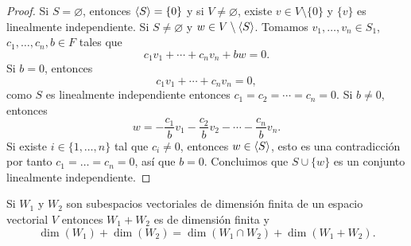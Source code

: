 \documentclass[12pt,a4paper]{book}
\begin{document}
    \begin{proof}
        Si $S=\varnothing$, entonces $\langle S \rangle=\{0\}$ y si $V\neq\varnothing$, existe $v\in V\setminus\{0\}$
        y $\{v\}$ es linealmente independiente. Si $S\neq\varnothing$ y $w\in V\setminus\langle S \rangle$.
        Tomamos $v_{1},\dots,v_{n}\in S_{1}$, $c_{1},\dots,c_{n},b\in F$ tales que
        \begin{equation*}
            c_{1}v_{1}+\cdots+c_{n}v_{n}+bw=0.
        \end{equation*}
        Si $b=0$, entonces
        \begin{equation*}
            c_{1}v_{1}+\cdots+c_{n}v_{n}=0,
        \end{equation*}
        como $S$ es linealmente independiente entonces $c_{1}=c_{2}=\cdots=c_{n}=0$. Si $b\neq0$,
        entonces
        \begin{equation*}
            w=-\frac{c_{1}}{b}v_{1}-\frac{c_{2}}{b}v_{2}-\cdots-\frac{c_{n}}{b}v_{n}.
        \end{equation*}
        Si existe $i\in\{1,\dots,n\}$ tal que $c_{i}\neq0$, entonces $w\in\langle S \rangle$, esto es
        una contradicción por tanto $c_{1}=\dots=c_{n}=0$, así que $b=0$. Concluimos que
        $S\cup\{w\}$ es un conjunto linealmente independiente.
    \end{proof}

    \begin{lema}
    \label{lema:4}
        Si $W_{1}$ y $W_{2}$ son subespacios vectoriales de dimensión finita de un espacio
        vectorial $V$ entonces $W_{1}+W_{2}$ es de dimensión finita y
        \begin{equation*}
            \dim(W_{1})+\dim(W_{2})=\dim(W_{1}\cap W_{2})+\dim(W_{1}+W_{2}).
        \end{equation*}
    \end{lema}
\end{document}

